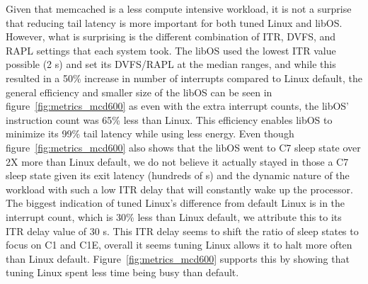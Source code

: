 Given that memcached is a less compute intensive workload, it is not a surprise that reducing tail latency is more important for both tuned Linux and libOS. However, what is surprising is the different combination of ITR, DVFS, and RAPL settings that each system took. The libOS used the lowest ITR value possible (2 \micro s) and set its DVFS/RAPL at the median ranges, and while this resulted in a 50\% increase in number of interrupts compared to Linux default, the general efficiency and smaller size of the libOS can be seen in figure~\ref{fig:metrics_mcd600} as even with the extra interrupt counts, the libOS' instruction count was 65\% less than Linux. This efficiency enables libOS to minimize its 99\% tail latency while using less energy. Even though figure~\ref{fig:metrics_mcd600} also shows that the libOS went to C7 sleep state over 2X more than Linux default, we do not believe it actually stayed in those a C7 sleep state given its exit latency (hundreds of \micro s) and the dynamic nature of the workload with such a low ITR delay that will constantly wake up the processor. The biggest indication of tuned Linux's difference from default Linux is in the interrupt count, which is 30\% less than Linux default, we attribute this to its ITR delay value of 30 \micro s. This ITR delay seems to shift the ratio of sleep states to focus on C1 and C1E, overall it seems tuning Linux allows it to halt more often than Linux default. Figure~\ref{fig:metrics_mcd600} supports this by showing that tuning Linux spent less time being busy than default.


%
